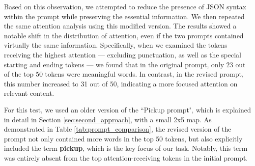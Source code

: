Based on this observation, we attempted to reduce the presence of JSON syntax
within the prompt while preserving the essential information. We then repeated the
same attention analysis using this modified version. The results showed a
notable shift in the distribution of attention, even if the two prompts contained
virtually the same information. Specifically, when we examined the tokens receiving
the highest attention — excluding punctuation, as well as the special starting
and ending tokens — we found that in the original prompt, only 23 out of the top
50 tokens were meaningful words. In contrast, in the revised prompt, this number
increased to 31 out of 50, indicating a more focused attention on relevant content.

For this test, we used an older version of the ``Pickup prompt", which is
explained in detail in Section \ref{sec:second_approach}, with a small 2x5 map.
As demonstrated in Table \ref{tab:prompt_comparison}, the revised version of the
prompt not only contained more words in the top 50 tokens, but also explicitly
included the term \textbf{pickup}, which is the key focus of our task. Notably,
this term was entirely absent from the top attention-receiving tokens in the
initial prompt.

